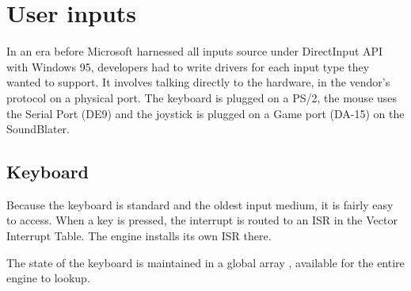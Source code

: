 \section{User inputs}
In an era before Microsoft harnessed all inputs source under DirectInput API with Windows 95, developers had to write drivers for each input type they wanted to support. It involves talking directly to the hardware, in the vendor's protocol on a physical port. The keyboard is plugged on a PS/2, the mouse uses the Serial Port (DE9) and the joystick is plugged on a Game port (DA-15) on the SoundBlater.





\subsection{Keyboard}

Because the keyboard is standard and the oldest input medium, it is fairly easy to access. When a key is pressed, the interrupt is routed to an ISR in the Vector Interrupt Table. The engine installs its own ISR there.


\par
\begin{minipage}{\textwidth}

\end{minipage}

The state of the keyboard is maintained in a global array , available for the entire engine to lookup.\\
\par

\begin{minipage}{\textwidth}

\end{minipage}



